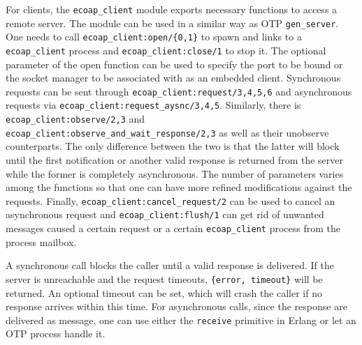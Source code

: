 For clients, the \verb|ecoap_client| module exports necessary functions to access a remote server. The module can be used in a similar way as OTP \verb|gen_server|. One needs to call \verb|ecoap_client:open/{0,1}| to spawn and links to a \verb|ecoap_client| process and \verb|ecoap_client:close/1| to stop it. The optional parameter of the open function can be used to specify the port to be bound or the socket manager to be associated with as an embedded client. Synchronous requests can be sent through \verb|ecoap_client:request/3,4,5,6| and asynchronous requests via \verb|ecoap_client:request_aysnc/3,4,5|. Similarly, there is \verb|ecoap_client:observe/2,3| and \verb|ecoap_client:observe_and_wait_response/2,3|  as well as their unobserve counterparts. The only difference between the two is that the latter will block until the first notification or another valid response is returned from the server while the former is completely asynchronous. The number of parameters varies among the functions so that one can have more refined modifications against the requests. Finally, \verb|ecoap_client:cancel_request/2| can be used to cancel an asynchronous request and \verb|ecoap_client:flush/1| can get rid of unwanted messages caused a certain request or a certain \verb|ecoap_client| process from the process mailbox. 


A synchronous call blocks the caller until a valid response is delivered. If the server is unreachable and the request timeouts, \verb|{error, timeout}| will be returned. An optional timeout can be set, which will crash the caller if no response arrives within this time. For asynchronous calls, since the response are delivered as message, one can use either the \verb|receive| primitive in Erlang or let an OTP process handle it. 

